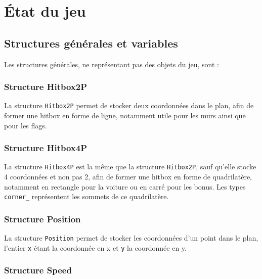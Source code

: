 \documentclass[11pt, final]{report}
\renewcommand{\tt}[1]{\texttt{#1}}
\begin{document}
\section{État du jeu}\subsection{Structures générales et variables}

Les structures générales, ne représentant pas des objets du jeu, sont : 

\subsubsection{Structure Hitbox2P}



La structure \tt{Hitbox2P} permet de stocker deux coordonnées dans le plan, afin de former une hitbox en forme de ligne, notamment utile pour les murs ainsi que pour les flags. 
\subsubsection{Structure Hitbox4P}


La structure \tt{Hitbox4P} est la même que la structure \tt{Hitbox2P}, sauf qu'elle stocke 4 coordonnées et non pas 2, afin de former une hitbox en forme de quadrilatère, notamment en rectangle pour la voiture ou en carré pour les bonus. Les types \tt{corner\_} représentent les sommets de ce quadrilatère.
\\

\subsubsection{Structure Position}



La structure \tt{Position} permet de stocker les coordonnées d'un point dans le plan, l'entier \tt{x} étant la coordonnée en x et \tt{y} la coordonnée en y.
\\

\subsubsection{Structure Speed}

\end{document}
